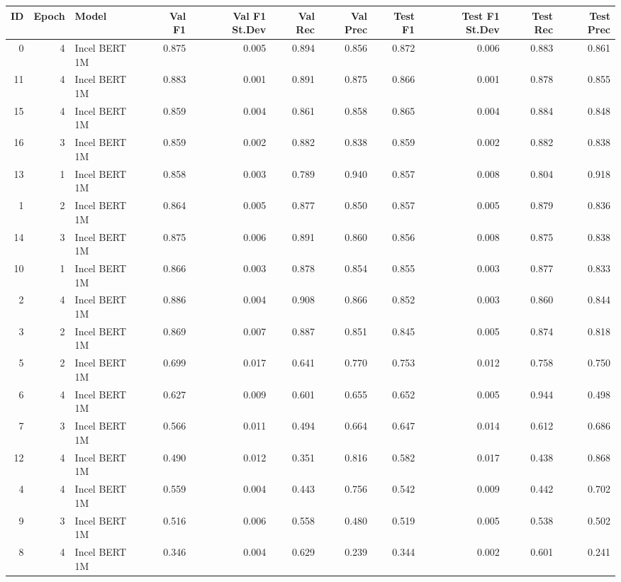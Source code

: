 \begin{tabular}{rrlrrrrrrrr}
\toprule
 ID &  Epoch &         Model &  Val F1 &  Val F1 St.Dev &  Val Rec &  Val Prec &  Test F1 &  Test F1 St.Dev &  Test Rec &  Test Prec \\
\midrule
  0 &      4 & Incel BERT 1M &   0.875 &          0.005 &    0.894 &     0.856 &    0.872 &           0.006 &     0.883 &      0.861 \\
 11 &      4 & Incel BERT 1M &   0.883 &          0.001 &    0.891 &     0.875 &    0.866 &           0.001 &     0.878 &      0.855 \\
 15 &      4 & Incel BERT 1M &   0.859 &          0.004 &    0.861 &     0.858 &    0.865 &           0.004 &     0.884 &      0.848 \\
 16 &      3 & Incel BERT 1M &   0.859 &          0.002 &    0.882 &     0.838 &    0.859 &           0.002 &     0.882 &      0.838 \\
 13 &      1 & Incel BERT 1M &   0.858 &          0.003 &    0.789 &     0.940 &    0.857 &           0.008 &     0.804 &      0.918 \\
  1 &      2 & Incel BERT 1M &   0.864 &          0.005 &    0.877 &     0.850 &    0.857 &           0.005 &     0.879 &      0.836 \\
 14 &      3 & Incel BERT 1M &   0.875 &          0.006 &    0.891 &     0.860 &    0.856 &           0.008 &     0.875 &      0.838 \\
 10 &      1 & Incel BERT 1M &   0.866 &          0.003 &    0.878 &     0.854 &    0.855 &           0.003 &     0.877 &      0.833 \\
  2 &      4 & Incel BERT 1M &   0.886 &          0.004 &    0.908 &     0.866 &    0.852 &           0.003 &     0.860 &      0.844 \\
  3 &      2 & Incel BERT 1M &   0.869 &          0.007 &    0.887 &     0.851 &    0.845 &           0.005 &     0.874 &      0.818 \\
  5 &      2 & Incel BERT 1M &   0.699 &          0.017 &    0.641 &     0.770 &    0.753 &           0.012 &     0.758 &      0.750 \\
  6 &      4 & Incel BERT 1M &   0.627 &          0.009 &    0.601 &     0.655 &    0.652 &           0.005 &     0.944 &      0.498 \\
  7 &      3 & Incel BERT 1M &   0.566 &          0.011 &    0.494 &     0.664 &    0.647 &           0.014 &     0.612 &      0.686 \\
 12 &      4 & Incel BERT 1M &   0.490 &          0.012 &    0.351 &     0.816 &    0.582 &           0.017 &     0.438 &      0.868 \\
  4 &      4 & Incel BERT 1M &   0.559 &          0.004 &    0.443 &     0.756 &    0.542 &           0.009 &     0.442 &      0.702 \\
  9 &      3 & Incel BERT 1M &   0.516 &          0.006 &    0.558 &     0.480 &    0.519 &           0.005 &     0.538 &      0.502 \\
  8 &      4 & Incel BERT 1M &   0.346 &          0.004 &    0.629 &     0.239 &    0.344 &           0.002 &     0.601 &      0.241 \\
\bottomrule
\end{tabular}
